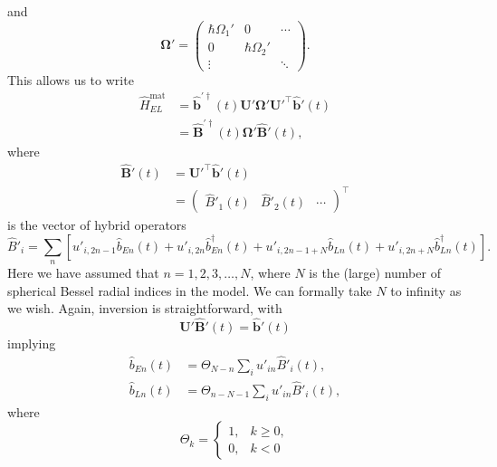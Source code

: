 \documentclass{article}
\begin{document}
and
\begin{equation}
\bm{\Omega}' = 
\begin{pmatrix}
\hbar\Omega_1' & 0 & \cdots\\
0 & \hbar\Omega_2' & \\
\vdots & & \ddots
\end{pmatrix}.
\end{equation}
This allows us to write
\begin{equation}
\begin{split}
\hat{H}_{EL}^\mathrm{mat} &= \hat{\mathbf{b}}^{\prime\dagger}(t)\mathbf{U}'\bm{\Omega}'\mathbf{U}'^\top\hat{\mathbf{b}}'(t)\\
&= \hat{\mathbf{B}}^{\prime\dagger}(t)\bm{\Omega}'\hat{\mathbf{B}}'(t),
\end{split}
\end{equation}
where
\begin{equation}
\begin{split}
\hat{\mathbf{B}}'(t) &= \mathbf{U}'^\top\hat{\mathbf{b}}'(t)\\
&= 
\begin{pmatrix}
\hat{B}'_1(t) & \hat{B}'_2(t) & \cdots
\end{pmatrix}^\top
\end{split}
\end{equation}
is the vector of hybrid operators
\begin{equation}
\hat{B}'_i = \sum_n\left[u'_{i,2n - 1}\hat{b}_{En}(t) + u'_{i,2n}\hat{b}_{En}^\dagger(t) + u'_{i,2n - 1 + N}\hat{b}_{Ln}(t) + u'_{i,2n + N}\hat{b}_{Ln}^\dagger(t)\right].
\end{equation}
Here we have assumed that $n = 1,2,3,\ldots,N$, where $N$ is the (large) number of spherical Bessel radial indices in the model. We can formally take $N$ to infinity as we wish. Again, inversion is straightforward, with
\begin{equation}
\mathbf{U}'\hat{\mathbf{B}}'(t) = \hat{\mathbf{b}}'(t)
\end{equation}
implying
\begin{equation}
\begin{split}
\hat{b}_{En}(t) &= \Theta_{N - n}\sum_iu'_{in}\hat{B}'_i(t),\\
\hat{b}_{Ln}(t) &= \Theta_{n - N - 1}\sum_iu'_{in}\hat{B}'_i(t),
\end{split}
\end{equation}
where
\begin{equation}
\Theta_k = 
\begin{cases}
1, & k \geq 0,\\
0, & k < 0
\end{cases}
\end{equation}
\end{document}
